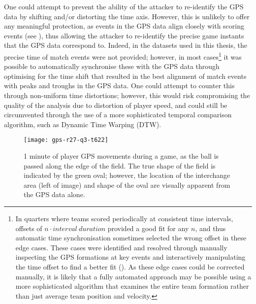 One could attempt to prevent the ability of the attacker to re-identify the GPS data by shifting and/or distorting the time axis. However, this is unlikely to offer any meaningful protection, as events in the GPS data align closely with scoring events (see ), thus allowing the attacker to re-identify the precise game instants that the GPS data correspond to. Indeed, in the datasets used in this thesis, the precise time of match events were not provided; however, in most cases\footnote{In quarters where teams scored periodically at consistent time intervals, offsets of $n\cdot {interval\ duration}$ provided a good fit for any $n$, and thus automatic time synchronisation sometimes selected the wrong offset in these edge cases. These cases were identified and resolved through manually inspecting the GPS formations at key events and interactively manipulating the time offset to find a better fit (). As these edge cases could be corrected manually, it is likely that a fully automated approach may be possible using a more sophisticated algorithm that examines the entire team formation rather than just average team position and velocity.} it was possible to automatically synchronise these with the GPS data through optimising for the time shift that resulted in the best alignment of match events with peaks and troughs in the GPS data. One could attempt to counter this through non-uniform time distortions; however, this would risk compromising the quality of the analysis due to distortion of player speed, and could still be circumvented through the use of a more sophisticated temporal comparison algorithm, such as Dynamic Time Warping (DTW).

\begin{figure}[!htb]
  \centering
  \texttt{[image: gps-r27-q3-t622]}
  \caption{1 minute of player GPS movements during a game, as the ball is passed along the edge of the field. The true shape of the field is indicated by the green oval; however, the location of the interchange area (left of image) and shape of the oval are visually apparent from the GPS data alone.}
  \label{fig:gps-edge-field}
\end{figure}

